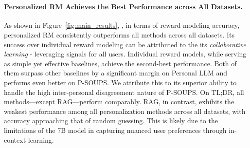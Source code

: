 
\begin{figure*}[htb]
\vspace{-0.5cm}
\centering
{}
 \\
\vspace{-0.1cm}
\vspace{-0.2cm}
\caption{\textbf{Averaged Reward Model Accuracy Comparison Across Three Personalization Datasets.} Figures (a), (b), and (c) show averaged accuracy results across three datasets with varying number of training samples. Figure (d) compares the accuracy of personalized algorithms across three datasets.}
\label{fig:main_results}
\vspace{-0.3cm}
\end{figure*}

\paragraph{Personalized RM Achieves the Best Performance across All Datasets.}
As shown in Figure~\ref{fig:main_results}, , in terms of reward modeling accuracy, personalized RM consistently outperforms all methods across all datasets. Its success over individual reward modeling can be attributed to the its \textit{collaborative learning} - leveraging signals for all users. 
Individual reward models, while serving as simple yet effective baselines, achieve the second-best performance. 
Both of them surpass other baselines by a significant margin on Personal LLM and performs even better on P-SOUPS. We attribute this to its superior ability to handle the high inter-personal disagreement nature of P-SOUPS.
On TL;DR, all methods—except RAG—perform comparably. RAG, in contrast, exhibits the weakest performance among all personalization methods across all datasets, with accuracy approaching that of random guessing. This is likely due to the limitations of the 7B model in capturing nuanced user preferences through in-context learning.






